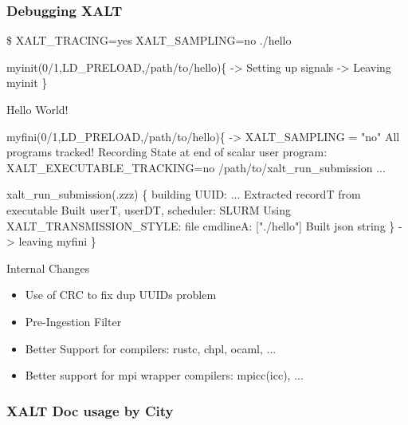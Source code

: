 \documentclass{beamer}
\begin{document}
\begin{frame}[fragile]
    \frametitle{Debugging XALT}
 {\tiny
    \begin{semiverbatim}
\$ XALT\_TRACING=yes XALT\_SAMPLING=no ./hello

myinit(0/1,LD_PRELOAD,/path/to/hello)\{
    -> Setting up signals
    -> Leaving myinit
\}

Hello World!

myfini(0/1,LD_PRELOAD,/path/to/hello)\{
    -> XALT_SAMPLING = "no" All programs tracked!
  Recording State at end of scalar user program:
    XALT_EXECUTABLE_TRACKING=no /path/to/xalt_run_submission ...

  xalt_run_submission(.zzz) \{
    building UUID: ...
    Extracted recordT from executable
    Built userT, userDT, scheduler: SLURM
    Using XALT_TRANSMISSION_STYLE: file
    cmdlineA: ["./hello"]
    Built json string
  \}
    -> leaving myfini
\}
    \end{semiverbatim}
}
\end{frame}

\begin{frame}{Internal Changes}
  \begin{itemize}
    \item Use of CRC to fix dup UUIDs problem
    \item Pre-Ingestion Filter
    \item Better Support for compilers: rustc, chpl, ocaml, ...
    \item Better support for mpi wrapper compilers: mpicc(icc), ...
  \end{itemize}
\end{frame}


\begin{frame}[fragile]
    \frametitle{XALT Doc usage by City}
\end{frame}
\end{document}

